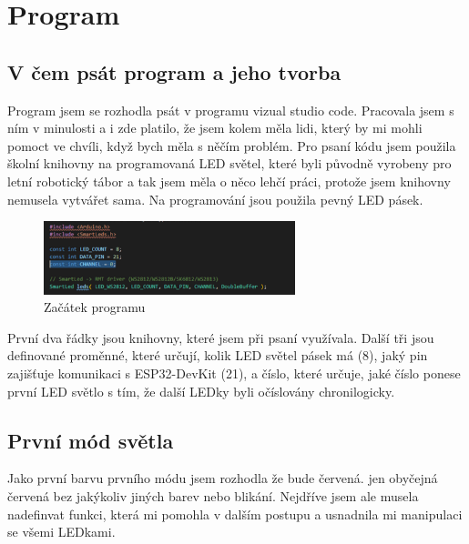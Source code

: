 \chapter{Program}

\section{V čem psát program a jeho tvorba}

Program jsem se rozhodla psát v programu vizual studio code. Pracovala jsem s ním v minulosti a i zde platilo, že jsem kolem měla lidi, který by mi mohli pomoct ve chvíli, když bych měla s něčím problém. Pro psaní kódu jsem použila školní knihovny na programovaná LED světel, které byli původně vyrobeny pro letní robotický tábor a tak jsem měla o něco lehčí práci, protože jsem knihovny nemusela vytvářet sama.  
Na programování jsou použila pevný LED pásek.

\begin{figure}[htbp]
	\centering
	\includegraphics[width=0.65\textwidth]{img/015 img/zacatek-programu.png}
	\caption{Začátek programu}
\end{figure}

První dva řádky jsou knihovny, které jsem při psaní využívala. Další tři jsou definované proměnné, které určují, kolik LED světel pásek má (8), jaký pin zajišťuje komunikaci s ESP32-DevKit (21), a číslo, které určuje, jaké číslo ponese první LED světlo s tím,  že další LEDky byli očíslovány chronilogicky.

\newpage

\section{První mód světla}
Jako první barvu prvního módu jsem rozhodla že bude červená. jen obyčejná červená bez jakýkoliv jiných barev nebo blikání. Nejdříve jsem ale musela nadefinvat funkci, která mi pomohla v dalším postupu a usnadnila mi manipulaci se všemi LEDkami. 

